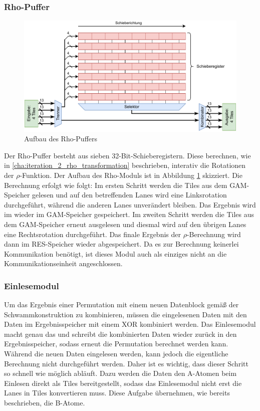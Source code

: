 \subsubsection{Rho-Puffer}
\begin{figure}
	\center
	\includegraphics{images/Rho-Aufbau.pdf}
	\caption{Aufbau des Rho-Puffers}
	\label{fig:rho_aufbau_iteration_3}
\end{figure}
Der Rho-Puffer besteht aus sieben 32-Bit-Schieberegistern. Diese berechnen, wie in \ref{cha:iteration_2_rho_transformation} beschrieben,
interativ die Rotationen der $\rho$-Funktion. Der Aufbau des Rho-Moduls ist in Abbildung \ref{fig:rho_aufbau_iteration_3} skizziert.
Die Berechnung erfolgt wie folgt: Im ersten Schritt werden die Tiles aus dem GAM-Speicher gelesen und auf den betreffenden Lanes
wird eine Linksrotation durchgeführt, während die anderen Lanes unverändert bleiben. Das Ergebnis wird im wieder im GAM-Speicher gespeichert.
Im zweiten Schritt werden die Tiles aus dem GAM-Speicher erneut ausgelesen und diesmal wird auf den übrigen Lanes eine Rechtsrotation durchgeführt.
Das finale Ergebnis der $\rho$-Berechnung wird dann im RES-Speicher wieder abgespeichert. Da es zur Berechnung keinerlei Kommunikation benötigt,
ist dieses Modul auch als einziges nicht an die Kommunikationseinheit angeschlossen.

\subsubsection{Einlesemodul}
Um das Ergebnis einer Permutation mit einem neuen Datenblock gemäß der Schwammkonstruktion zu kombinieren, müssen die eingelesenen Daten
mit den Daten im Ergebnisspeicher mit einem XOR kombiniert werden. Das Einlesemodul macht genau das und schreibt die kombinierten Daten
wieder zurück in den Ergebnisspeicher, sodass erneut die Permutation berechnet werden kann. Während die neuen Daten eingelesen werden,
kann jedoch die eigentliche Berechnung nicht durchgeführt werden. Daher ist es wichtig, dass dieser Schritt so schnell wie möglich abläuft.
Dazu werden die Daten den A-Atomen beim Einlesen direkt als Tiles bereitgestellt, sodass das Einlesemodul nicht erst die Lanes in Tiles konvertieren muss.
Diese Aufgabe übernehmen, wie bereits beschrieben, die B-Atome.

